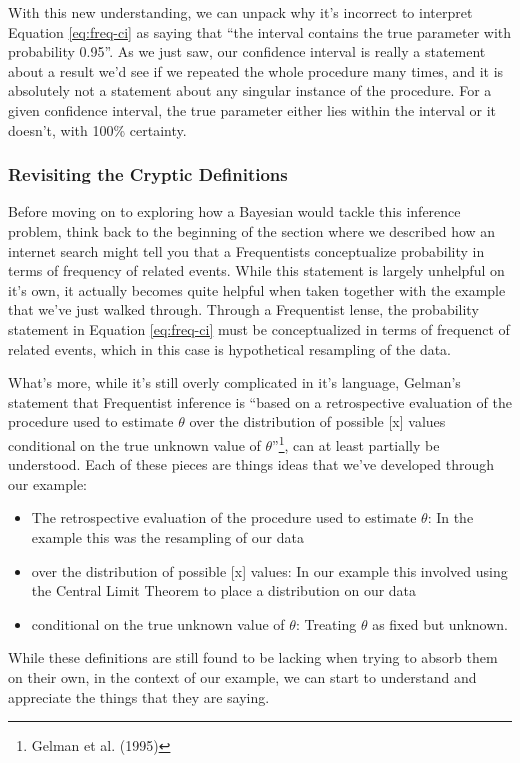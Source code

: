 \documentclass[12pt,twoside]{reedthesis}
\providecommand{\tightlist}{%
  \setlength{\itemsep}{0pt}\setlength{\parskip}{0pt}}
\begin{document}
With this new understanding, we can unpack why it's incorrect to interpret Equation \eqref{eq:freq-ci} as saying that ``the interval contains the true parameter with probability 0.95''. As we just saw, our confidence interval is really a statement about a result we'd see if we repeated the whole procedure many times, and it is absolutely not a statement about any singular instance of the procedure. For a given confidence interval, the true parameter either lies within the interval or it doesn't, with 100\% certainty.

\hypertarget{revisiting-the-cryptic-definitions}{%
\subsubsection{Revisiting the Cryptic Definitions}\label{revisiting-the-cryptic-definitions}}

Before moving on to exploring how a Bayesian would tackle this inference problem, think back to the beginning of the section where we described how an internet search might tell you that a Frequentists conceptualize probability in terms of frequency of related events. While this statement is largely unhelpful on it's own, it actually becomes quite helpful when taken together with the example that we've just walked through. Through a Frequentist lense, the probability statement in Equation \eqref{eq:freq-ci} must be conceptualized in terms of frequenct of related events, which in this case is hypothetical resampling of the data.

What's more, while it's still overly complicated in it's language, Gelman's statement that Frequentist inference is ``based on a retrospective evaluation of the procedure used to estimate \(\theta\) over the distribution of possible {[}x{]} values conditional on the true unknown value of \(\theta\)''\footnote{Gelman et al. (1995)}, can at least partially be understood. Each of these pieces are things ideas that we've developed through our example:
\begin{itemize}
\tightlist
\item
  The retrospective evaluation of the procedure used to estimate \(\theta\): In the example this was the resampling of our data
\item
  over the distribution of possible {[}x{]} values: In our example this involved using the Central Limit Theorem to place a distribution on our data
\item
  conditional on the true unknown value of \(\theta\): Treating \(\theta\) as fixed but unknown.
\end{itemize}
While these definitions are still found to be lacking when trying to absorb them on their own, in the context of our example, we can start to understand and appreciate the things that they are saying.
\end{document}
